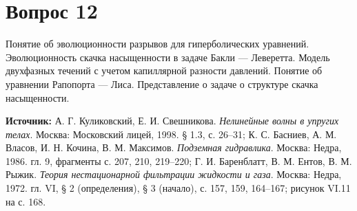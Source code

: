 \documentclass[12pt,a4paper]{article}
\begin{document}
\section*{Вопрос 12}
Понятие об эволюционности разрывов для гиперболических уравнений. Эволюционность скачка насыщенности в задаче Бакли — Леверетта. Модель двухфазных течений с учетом капиллярной разности давлений. Понятие об уравнении Рапопорта — Лиса. Представление о задаче о структуре скачка насыщенности.

\medskip
\noindent\textbf{Источник:} А. Г. Куликовский, Е. И. Свешникова. \textit{Нелинейные волны в упругих телах}. Москва: Московский лицей, 1998. § 1.3, с. 26--31; К. С. Басниев, А. М. Власов, И. Н. Кочина, В. М. Максимов. \textit{Подземная гидравлика}. Москва: Недра, 1986. гл. 9, фрагменты с. 207, 210, 219--220; Г. И. Баренблатт, В. М. Ентов, В. М. Рыжик. \textit{Теория нестационарной фильтрации жидкости и газа}. Москва: Недра, 1972. гл. VI, § 2 (определения), § 3 (начало), с. 157, 159, 164--167; рисунок VI.11 на с. 168.
\par\bigskip

\end{document}
